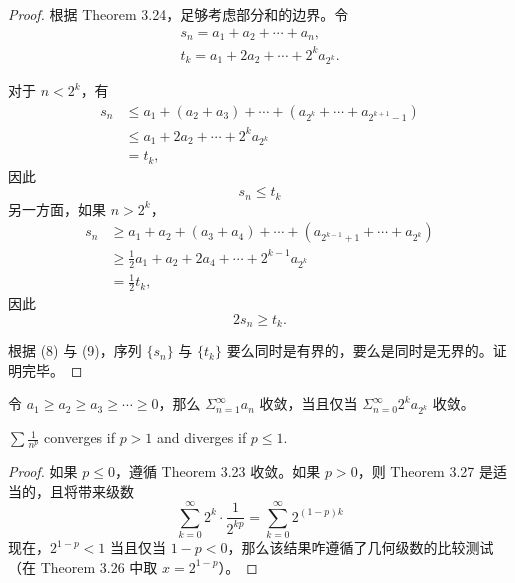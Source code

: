 \documentclass[../poma-notes.tex]{subfiles}
\begin{document}
\begin{proof}
  根据 Theorem 3.24，足够考虑部分和的边界。令
  \begin{gather*}
    s_n = a_1 + a_2 + \cdots + a_n, \\
    t_k = a_1 + 2a_2 + \cdots + 2^k a_{2^k}.
  \end{gather*}

  对于 $n < 2^k$，有
  \begin{align*}
    \mathcal{} s_n & \le a_1 + (a_2 + a_3) + \cdots + (a_{2^k} + \cdots + a_{2^{k+1}-1}) \\
                   & \le a_1 + 2a_2 + \cdots + 2^k a_{2^k}                               \\
                   & = t_k,
  \end{align*}
  因此
  \begin{equation}
    s_n \le t_k
  \end{equation}
  另一方面，如果 $n > 2^k$，
  \begin{align*}
    \mathcal{} s_n & \ge a_1 + a_2 + (a_3 + a_4) + \cdots + (a_{2^{k-1}+1} + \cdots + a_{2^k}) \\
                   & \ge \frac{1}{2}a_1 + a_2 + 2a_4 + \cdots + 2^{k-1}a_{2^k}                 \\
                   & = \frac{1}{2} t_k,
  \end{align*}
  因此
  \begin{equation}
    2s_n \ge t_k.
  \end{equation}

  根据 (8) 与 (9)，序列 $\{s_n\}$ 与 $\{t_k\}$ 要么同时是有界的，要么是同时是无界的。证明完毕。
\end{proof}

\begin{anote}
  令 $a_1 \ge a_2 \ge a_3 \ge \cdots \ge 0$，那么 $\Sigma_{n=1}^{\infty} a_n$ 收敛，当且仅当 $\Sigma_{n=0}^{\infty}2^k a_{2^k}$ 收敛。
\end{anote}


\begin{theorem}
  $\sum \frac{1}{n^p}$ converges if $p > 1$ and diverges if $p \le 1$.
\end{theorem}

\begin{proof}
  如果 $p \le 0$，遵循 Theorem 3.23 收敛。如果 $p > 0$，则 Theorem 3.27 是适当的，且将带来级数
  \[ \sum_{k=0}^{\infty} 2^k \cdot \frac{1}{2^{kp}} = \sum_{k=0}^{\infty} 2^{(1-p)k} \]
  现在，$2^{1-p} < 1$ 当且仅当 $1-p < 0$，那么该结果咋遵循了几何级数的比较测试（在 Theorem 3.26 中取 $x = 2^{1-p}$）。
\end{proof}
\end{document}
